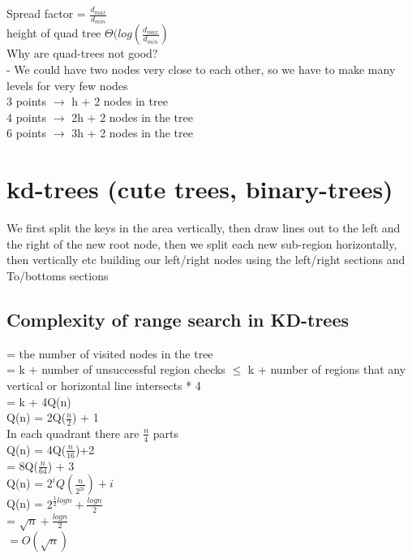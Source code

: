 \documentclass[12pt]{article}
\begin{document}
	Spread factor = $\frac{d_{max}}{d_{min}}$\\
	height of quad tree $\Theta(log(\frac{d_{max}}{d_{min}})$\\
	
	Why are quad-trees not good?\\
	- We could have two nodes very close to each other, so we have to make many levels for very few nodes\\
	3 points $\rightarrow$ h + 2 nodes in tree\\
	4 points $\rightarrow$ 2h + 2 nodes in the tree\\
	6 points $\rightarrow$ 3h + 2 nodes in the tree\\
	
	\section*{kd-trees (cute trees, binary-trees)}
	
	We first split the keys in the area vertically, then draw lines out to the left and the right of the new root node, then we split each new sub-region horizontally, then vertically etc building our left/right nodes using the left/right sections and To/bottoms sections\\
	
	\subsection*{Complexity of range search in KD-trees}
	= the number of visited nodes in the tree\\
	= k + number of unsuccessful region checks
	$\leq$ k + number of regions that any vertical or horizontal line intersects * 4\\
	= k + 4Q(n)\\
	
	Q(n) = 2Q($\frac{n}{2}$) + 1\\
	
	In each quadrant there are $\frac{n}{4}$ parts\\
	Q(n) = 4Q($\frac{n}{16}$)+2\\
	= 8Q($\frac{n}{64}$) + 3\\
	Q(n) = $2^iQ(\frac{n}{2^{2i}}) + i$\\
	
	Q(n) = $2^{\frac{1}{2}logn} + \frac{logn}{2}$\\
	= $\sqrt{n} + \frac{logn}{2}$\\
	$= O(\sqrt{n})$\\
	
\end{document}
